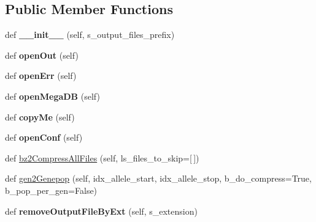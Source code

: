 \subsection*{Public Member Functions}
\begin{DoxyCompactItemize}
\item 
def {\bfseries \+\_\+\+\_\+init\+\_\+\+\_\+} (self, s\+\_\+output\+\_\+files\+\_\+prefix)\hypertarget{classnegui_1_1pgoutputsimupop_1_1PGOutputSimuPop_a8f42fc0afc9024177960bb6287e45493}{}\label{classnegui_1_1pgoutputsimupop_1_1PGOutputSimuPop_a8f42fc0afc9024177960bb6287e45493}

\item 
def {\bfseries open\+Out} (self)\hypertarget{classnegui_1_1pgoutputsimupop_1_1PGOutputSimuPop_a7cea46f9212d05e98ce14b7647781590}{}\label{classnegui_1_1pgoutputsimupop_1_1PGOutputSimuPop_a7cea46f9212d05e98ce14b7647781590}

\item 
def {\bfseries open\+Err} (self)\hypertarget{classnegui_1_1pgoutputsimupop_1_1PGOutputSimuPop_ae3f0c28a1a9afbef82fddd8d26d3ea3b}{}\label{classnegui_1_1pgoutputsimupop_1_1PGOutputSimuPop_ae3f0c28a1a9afbef82fddd8d26d3ea3b}

\item 
def {\bfseries open\+Mega\+DB} (self)\hypertarget{classnegui_1_1pgoutputsimupop_1_1PGOutputSimuPop_afac367cb22b4498a2c5170173de1bdc1}{}\label{classnegui_1_1pgoutputsimupop_1_1PGOutputSimuPop_afac367cb22b4498a2c5170173de1bdc1}

\item 
def {\bfseries copy\+Me} (self)\hypertarget{classnegui_1_1pgoutputsimupop_1_1PGOutputSimuPop_a5ab021b0ff9d452891a52313b9402fbf}{}\label{classnegui_1_1pgoutputsimupop_1_1PGOutputSimuPop_a5ab021b0ff9d452891a52313b9402fbf}

\item 
def {\bfseries open\+Conf} (self)\hypertarget{classnegui_1_1pgoutputsimupop_1_1PGOutputSimuPop_abd8a699e5a3adf2b746bdb778602fe60}{}\label{classnegui_1_1pgoutputsimupop_1_1PGOutputSimuPop_abd8a699e5a3adf2b746bdb778602fe60}

\item 
def \hyperlink{classnegui_1_1pgoutputsimupop_1_1PGOutputSimuPop_a3046e1eac1fbd82acf47c0f7c0d06b70}{bz2\+Compress\+All\+Files} (self, ls\+\_\+files\+\_\+to\+\_\+skip=\mbox{[}$\,$\mbox{]})
\item 
def \hyperlink{classnegui_1_1pgoutputsimupop_1_1PGOutputSimuPop_af093f63ef577cb9d9778920ec6589516}{gen2\+Genepop} (self, idx\+\_\+allele\+\_\+start, idx\+\_\+allele\+\_\+stop, b\+\_\+do\+\_\+compress=True, b\+\_\+pop\+\_\+per\+\_\+gen=False)
\item 
def {\bfseries remove\+Output\+File\+By\+Ext} (self, s\+\_\+extension)\hypertarget{classnegui_1_1pgoutputsimupop_1_1PGOutputSimuPop_a27af4e615fcb17d2343dc27f614c1359}{}\label{classnegui_1_1pgoutputsimupop_1_1PGOutputSimuPop_a27af4e615fcb17d2343dc27f614c1359}


\end{DoxyCompactItemize}
